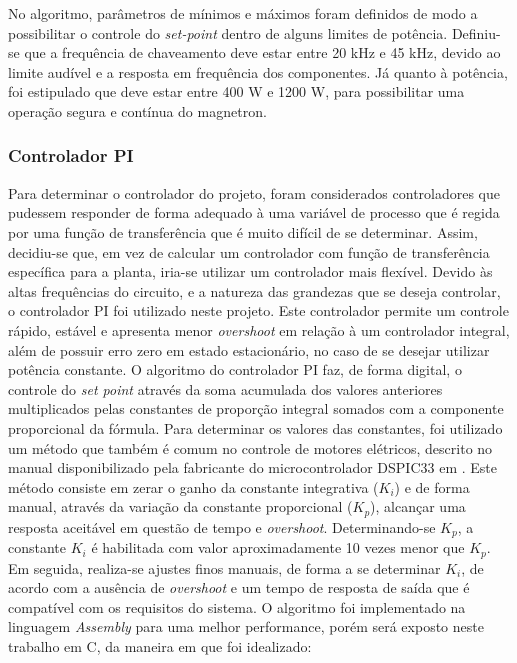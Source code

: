 No algoritmo, parâmetros de mínimos e máximos foram definidos de modo a possibilitar o controle do \textit{set-point} dentro de alguns limites de potência. Definiu-se que a frequência de chaveamento deve estar entre 20 kHz e 45 kHz, devido ao limite audível e a resposta em frequência dos componentes. Já quanto à potência, foi estipulado que deve estar entre 400 W e 1200 W, para possibilitar uma operação segura e contínua do magnetron.

\subsubsection{Controlador PI}
Para determinar o controlador do projeto, foram considerados controladores que pudessem responder de forma adequado à uma variável de processo que é regida por uma função de transferência que é muito difícil de se determinar. Assim, decidiu-se que, em vez de calcular um controlador com função de transferência específica para a planta, iria-se utilizar um controlador mais flexível. Devido às altas frequências do circuito, e a natureza das grandezas que se deseja controlar, o controlador PI foi utilizado neste projeto. Este controlador permite um controle rápido, estável e apresenta menor \textit{overshoot} em relação à um controlador integral, além de possuir erro zero em estado estacionário, no caso de se desejar utilizar potência constante. O algoritmo do controlador PI faz, de forma digital, o controle do \textit{set point} através da soma acumulada dos valores anteriores multiplicados pelas constantes de proporção integral somados com a componente proporcional da fórmula. Para determinar os valores das constantes, foi utilizado um método que também é comum no controle de motores elétricos, descrito no manual disponibilizado pela fabricante do microcontrolador DSPIC33 em . Este método consiste em zerar o ganho da constante integrativa ($K_i$) e de forma manual, através da variação da constante proporcional ($K_p$), alcançar uma resposta aceitável em questão de tempo e \textit{overshoot}. Determinando-se $K_p$, a constante $K_i$ é habilitada com valor aproximadamente 10 vezes menor que $K_p$. Em seguida, realiza-se ajustes finos manuais, de forma a se determinar $K_i$, de acordo com a ausência de \textit{overshoot} e um tempo de resposta de saída que é compatível com os requisitos do sistema. O algoritmo foi implementado na linguagem \textit{Assembly} para uma melhor performance, porém será exposto neste trabalho em C, da maneira em que foi idealizado:

